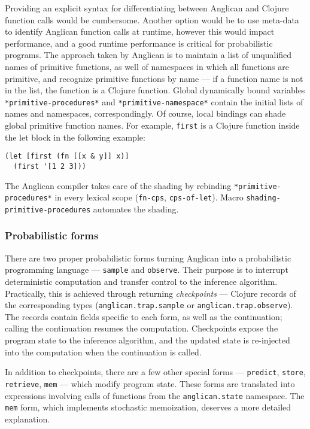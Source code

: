 \documentclass[a4paper]{article}
\begin{document}
Providing an explicit syntax for differentiating between
Anglican and Clojure function calls would be cumbersome. Another
option would be to use meta-data to identify Anglican function
calls at runtime, however this would impact performance, and
a good runtime performance is critical for probabilistic
programs. The approach taken by Anglican is to maintain a list
of unqualified names of primitive functions, as well of
namespaces in which all functions are primitive, and recognize
primitive functions by name --- if a function name is not in the
list, the function is a Clojure function. Global dynamically
bound variables \texttt{*primitive-procedures*} and
\texttt{*primitive-namespace*} contain the initial lists of
names and namespaces, correspondingly. Of course, local bindings
can shade global primitive function names. For example,
\texttt{first} is a Clojure function inside the let block in the
following example:
\begin{lstlisting}[frame=single,language=Anglican, basicstyle=\scriptsize\ttfamily, showstringspaces=false]
(let [first (fn [[x & y]] x)]
  (first '[1 2 3]))
\end{lstlisting}
The Anglican compiler takes care of the shading by rebinding
\texttt{*primitive-procedures*} in every lexical scope
(\texttt{fn-cps}, \texttt{cps-of-let}). Macro
\texttt{shading-primitive-procedures} automates the shading.

\subsubsection{Probabilistic forms}

There are two proper probabilistic forms turning Anglican into a
probabilistic programming language --- \texttt{sample} and
\texttt{observe}. Their purpose is to interrupt deterministic
computation and transfer control to the inference algorithm.
Practically, this is achieved through returning
\textit{checkpoints} --- Clojure records of the corresponding
types (\texttt{anglican.trap.sample} or
\texttt{anglican.trap.observe}). The records contain fields
specific to each form, as well as the continuation; calling the
continuation resumes the computation. Checkpoints expose the
program state to the inference algorithm, and the updated state
is re-injected into the computation when the continuation is
called. 

In addition to checkpoints, there are a few other special forms
--- \texttt{predict}, \texttt{store}, \texttt{retrieve},
\texttt{mem} --- which modify program state. These forms are
translated into expressions involving calls of functions from the
\texttt{anglican.state} namespace. The \texttt{mem} form, which
implements stochastic memoization, deserves a more detailed
explanation.
\end{document}
